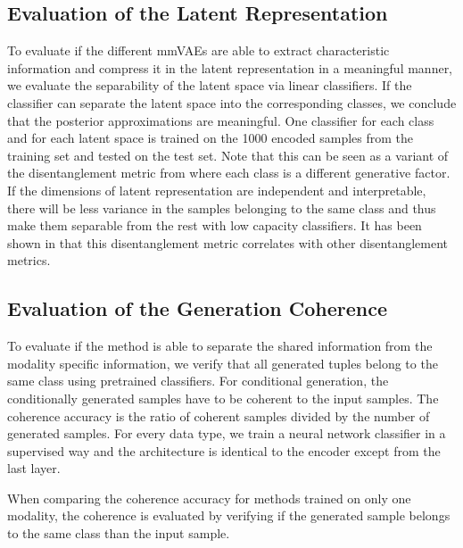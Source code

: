 \subsection{Evaluation of the Latent Representation} \label{subsec:lr metric}
To evaluate if the different mmVAEs are able to extract characteristic information and compress it in the latent representation in a meaningful manner, we evaluate the separability of the latent space via linear classifiers.
If the classifier can separate the latent space into the corresponding classes, we conclude that the posterior approximations are meaningful.
One classifier for each class and for each latent space is trained on the 1000 encoded samples from the training set and tested on the test set.
Note that this can be seen as a variant of the disentanglement metric from \citep{beta_vae} where each class is a different generative factor.
If the dimensions of latent representation are independent and interpretable, there will be less variance in the samples belonging to the same class and thus make them separable from the rest with low capacity classifiers.
It has been shown in \citep{locatello_challenging_2019} that this disentanglement metric correlates with other disentanglement metrics.

\subsection{Evaluation of the Generation Coherence}
\label{subsubsec:gen_coh}
To evaluate if the method is able to separate the shared information from the modality specific information, we verify that all generated tuples belong to the same class using pretrained classifiers.
For conditional generation, the conditionally generated samples have to be coherent to the input samples.
The coherence accuracy is the ratio of coherent samples divided by the number of generated samples.
For every data type, we train a neural network classifier in a supervised way and the architecture is identical to the encoder except from the last layer.

When comparing the coherence accuracy for methods trained on only one modality, the coherence is evaluated by verifying if the generated sample belongs to the same class than the input sample.

